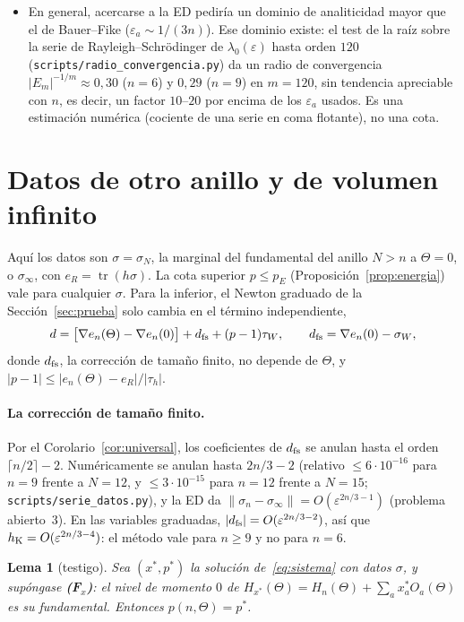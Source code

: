 \documentclass[11pt,a4paper]{article}
\newtheorem{lema}[teorema]{Lema}
\theoremstyle{definition}
\theoremstyle{remark}
\newcommand{\tr}{\operatorname{tr}}
\newcommand{\eps}{\varepsilon}
\newcommand{\pE}{p_{E}}
\newcommand{\scr}[1]{\texttt{scripts/#1}}
\begin{document}
\begin{itemize}
  $6{,}9\cdot10^{-8}$.
\item En general, acercarse a la ED pediría un dominio de analiticidad mayor que el de Bauer--Fike
  ($\eps_a\sim1/(3n)$). Ese dominio existe: el test de la raíz sobre la serie de Rayleigh--Schrödinger de
  $\lambda_0(\eps)$ hasta orden $120$ (\scr{radio\_convergencia.py}) da un radio de convergencia
  $|E_m|^{-1/m}\approx0{,}30$ ($n=6$) y $0{,}29$ ($n=9$) en $m=120$, sin tendencia apreciable con $n$, es decir,
  un factor $10$--$20$ por encima de los $\eps_a$ usados. Es una estimación numérica (cociente de una serie en
  coma flotante), no una cota.
\end{itemize}

\section{Datos de otro anillo y de volumen infinito}\label{sec:datos_ext}

Aquí los datos son $\sigma=\sigma_N$, la marginal del fundamental del anillo $N>n$ a $\Theta=0$, o $\sigma_\infty$, con
$e_R=\tr(h\sigma)$. La cota superior $p\le\pE$ (Proposición~\ref{prop:energia}) vale para cualquier $\sigma$. Para la
inferior, el Newton graduado de la Sección~\ref{sec:prueba} solo cambia en el término independiente,
\[
  d=\big[\nabla e_n(\Theta)-\nabla e_n(0)\big]+d_{\rm fs}+(p-1)\tau_W,\qquad d_{\rm fs}=\nabla e_n(0)-\sigma_W ,
\]
donde $d_{\rm fs}$, la corrección de tamaño finito, no depende de $\Theta$, y $|p-1|\le|e_n(\Theta)-e_R|/|\tau_h|$.

\paragraph{La corrección de tamaño finito.} Por el Corolario~\ref{cor:universal}, los coeficientes de $d_{\rm fs}$
se anulan hasta el orden $\lceil n/2\rceil-2$. Numéricamente se anulan hasta $2n/3-2$ (relativo $\le6\cdot10^{-16}$
para $n=9$ frente a $N=12$, y $\le3\cdot10^{-15}$ para $n=12$ frente a $N=15$; \scr{serie\_datos.py}), y la ED da
$\|\sigma_n-\sigma_\infty\|=O(\eps^{2n/3-1})$ (problema abierto~3). En las variables graduadas,
$|d_{\rm fs}|=O(\eps^{2n/3-2})$, así que $h_{\rm K}=O(\eps^{2n/3-4})$: el método vale para $n\ge9$ y no para
$n=6$.

\begin{lema}[testigo]\label{lem:testigo}
Sea $(x^*,p^*)$ la solución de~\eqref{eq:sistema} con datos $\sigma$, y supóngase
\textbf{(F$_x$)}: el nivel de momento $0$ de $H_{x^*}(\Theta)=H_n(\Theta)+\sum_ax^*_aO_a(\Theta)$ es su fundamental.
Entonces $p(n,\Theta)=p^*$.
\end{lema}
\end{document}
